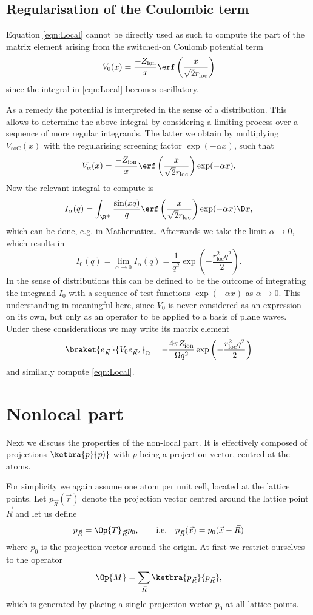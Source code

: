 \documentclass{MFHarticle}
\begin{document}
\subsection{Regularisation of the Coulombic term}
Equation \eqref{eqn:Local} cannot be directly used as such
to compute the part of the matrix element arising from the
switched-on Coulomb potential term
\[
	V_\text{0}(x) =
	\frac{-Z_\text{ion}}{x} \erf\left( \frac{x}{\sqrt2 r_\text{loc}} \right)
\]
since the integral in \eqref{eqn:Local} becomes oscillatory.

As a remedy the potential is interpreted in the sense of a distribution.
This allows to determine the above integral
by considering a limiting process over a sequence of more regular integrands.
The latter we obtain by multiplying $V_\text{soC}(x)$ with the
regularising screening factor $\exp(- \alpha x)$,
such that
\[
	V_{\alpha}(x) =
	\frac{-Z_\text{ion}}{x} \erf\left( \frac{x}{\sqrt2 r_\text{loc}} \right)
	\exp(- \alpha x).
\]
Now the relevant integral to compute is
\[ I_\alpha(q) =
	\int_{\R^+} \frac{\sin(x q)}{q}\erf\left( \frac{x}{\sqrt2 r_\text{loc}} \right)
	\exp(- \alpha x) \D x,
\]
which can be done, e.g. in Mathematica.
Afterwards we take the limit $\alpha \rightarrow 0$,
which results in
\[
	I_0(q) = \lim_{\alpha \rightarrow 0} I_\alpha(q)
	= \frac1{q^2} \exp\left( -\frac{r_\text{loc}^2 q^2}{2}\right).
\]
In the sense of distributions this can be defined
to be the outcome of integrating the integrand
$I_0$ with a sequence of test functions $\exp(- \alpha x)$ as $\alpha \to 0$.
This understanding in meaningful here,
since $V_\text{0}$ is never considered as an expression on its own,
but only as an operator to be applied to a basis of plane waves.
Under these considerations we may write its matrix element
\[
	\braket{e_{\vec{K}}}{V_0 e_{\vec{K}'}}_\Omega
	= -\frac{4\pi Z_\text{ion}}{\Omega q^2}
	\exp\left( -\frac{r_\text{loc}^2 q^2}{2}\right)
\]
and similarly compute \eqref{eqn:Local}.

\section{Nonlocal part}
Next we discuss the properties of the non-local part.
It is effectively composed of projections $\ketbra{p}{p)}$
with $p$ being a projection vector, centred at the atoms.

For simplicity we again assume one atom per unit cell,
located at the lattice points.
Let $p_{\vec{R}}(\vec{r})$ denote the projection vector centred
around the lattice point $\vec{R}$ and let us define
\[ p_{\vec{R}} = \Op{T}_{\vec{R}} p_0,
\qquad \text{i.e.} \quad
p_{\vec{R}}(\vec{x}) = p_0(\vec{x} - \vec{R})   \]
where $p_0$ is the projection vector around the origin.
At first we restrict ourselves to the operator
\[ \Op{M} = \sum_{\vec{R}} \ketbra{p_{\vec{R}}}{p_{\vec{R}} }, \]
which is generated by placing a single projection vector $p_0$
at all lattice points.
\end{document}
